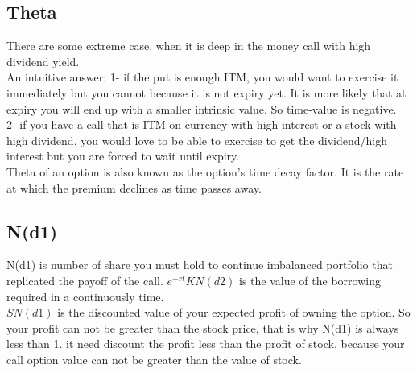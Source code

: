 \documentclass[a4paper,11pt]{article}
\begin{document}
\subsection{Theta}
There are some extreme case, when it is deep in the money call with high dividend yield.\\
An intuitive answer:
1- if the put is enough ITM, you would want to exercise it immediately but you cannot because it is not expiry yet. It is more likely that at expiry you will end up with a smaller intrinsic value. So time-value is negative.\\
2- if you have a call that is ITM on currency with high interest or a stock with high dividend, you would love to be able to exercise to get the dividend/high interest but you are forced to wait until expiry.\\
 Theta of an option is also known as the option's time decay factor. It is the rate at which the premium declines as time passes away.\\

\subsection{N(d1)}
N(d1) is number of share you must hold to continue imbalanced portfolio that replicated the payoff of the call.
$e^{-rt}KN(d2)$ is the value of the borrowing required in a continuously time.\\
 $SN(d1)$ is the discounted value of your expected profit of owning the option. So your profit can not be greater than the stock price, that is why N(d1) is always less than 1. it need discount the profit less than the profit of stock, because your call option value can not be greater than the value of stock.
\end{document}
